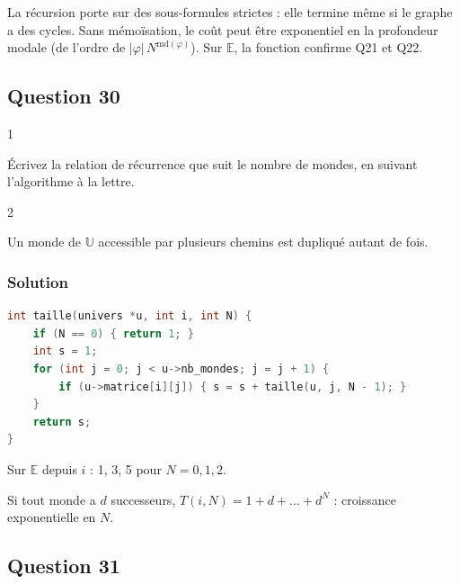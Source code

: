 \documentclass[11pt,a4paper]{article}
\newcommand{\equationajustee}[1]{%
  \sbox{\boiteequation}{$\displaystyle #1$}%
  \ifdim\wd\boiteequation>\linewidth
    \[\resizebox{\linewidth}{!}{\usebox{\boiteequation}}\]%
  \else
    \[#1\]%
  \fi}
\begin{document}
La récursion porte sur des sous-formules strictes : elle termine même si le graphe a des cycles. Sans mémoïsation, le coût peut être exponentiel en la profondeur modale (de l'ordre de \(|\varphi|\,N^{\mathrm{md}(\varphi)}\)). Sur \(\mathbb E\), la fonction confirme Q21 et Q22.

\hypertarget{question-30}{%
\subsection{Question 30}\label{question-30}}

\begin{indication}{1}

Écrivez la relation de récurrence que suit le nombre de mondes, en suivant l'algorithme à la lettre.

\end{indication}

\begin{indication}{2}

Un monde de \(\mathbb U\) accessible par plusieurs chemins est dupliqué autant de fois.

\end{indication}

\hypertarget{solution-29}{%
\subsubsection{Solution}\label{solution-29}}

\equationajustee{\boxed{\begin{aligned}
T(i,0)&=1\\
T(i,N)&=1+\sum_{j\,:\,R_{\mathbb U}(i,j)}T(j,N-1)
\end{aligned}}}

\begin{lstlisting}[language=C]
int taille(univers *u, int i, int N) {
    if (N == 0) { return 1; }
    int s = 1;
    for (int j = 0; j < u->nb_mondes; j = j + 1) {
        if (u->matrice[i][j]) { s = s + taille(u, j, N - 1); }
    }
    return s;
}
\end{lstlisting}

Sur \(\mathbb E\) depuis \(i\) : 1, 3, 5 pour \(N=0,1,2\).

Si tout monde a \(d\) successeurs, \(T(i,N)=1+d+\dots+d^N\) : croissance exponentielle en \(N\).

\hypertarget{question-31}{%
\subsection{Question 31}\label{question-31}}
\end{document}
